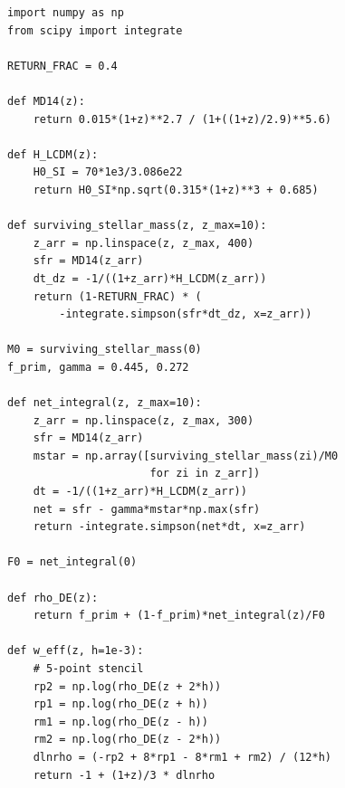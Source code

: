 \documentclass[12pt,preprint]{aastex631}
\begin{document}
\begin{verbatim}
import numpy as np
from scipy import integrate

RETURN_FRAC = 0.4

def MD14(z):
    return 0.015*(1+z)**2.7 / (1+((1+z)/2.9)**5.6)

def H_LCDM(z):
    H0_SI = 70*1e3/3.086e22
    return H0_SI*np.sqrt(0.315*(1+z)**3 + 0.685)

def surviving_stellar_mass(z, z_max=10):
    z_arr = np.linspace(z, z_max, 400)
    sfr = MD14(z_arr)
    dt_dz = -1/((1+z_arr)*H_LCDM(z_arr))
    return (1-RETURN_FRAC) * (
        -integrate.simpson(sfr*dt_dz, x=z_arr))

M0 = surviving_stellar_mass(0)
f_prim, gamma = 0.445, 0.272

def net_integral(z, z_max=10):
    z_arr = np.linspace(z, z_max, 300)
    sfr = MD14(z_arr)
    mstar = np.array([surviving_stellar_mass(zi)/M0
                      for zi in z_arr])
    dt = -1/((1+z_arr)*H_LCDM(z_arr))
    net = sfr - gamma*mstar*np.max(sfr)
    return -integrate.simpson(net*dt, x=z_arr)

F0 = net_integral(0)

def rho_DE(z):
    return f_prim + (1-f_prim)*net_integral(z)/F0

def w_eff(z, h=1e-3):
    # 5-point stencil
    rp2 = np.log(rho_DE(z + 2*h))
    rp1 = np.log(rho_DE(z + h))
    rm1 = np.log(rho_DE(z - h))
    rm2 = np.log(rho_DE(z - 2*h))
    dlnrho = (-rp2 + 8*rp1 - 8*rm1 + rm2) / (12*h)
    return -1 + (1+z)/3 * dlnrho
\end{verbatim}



\end{document}

